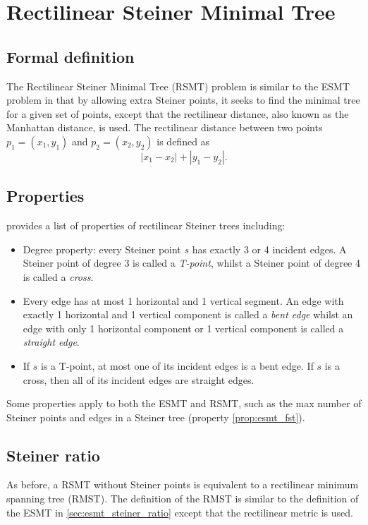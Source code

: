 \documentclass{l4proj}
\begin{document}
\section{Rectilinear Steiner Minimal Tree}
\subsection{Formal definition}
The Rectilinear Steiner Minimal Tree (RSMT) problem is similar to the ESMT problem in that by allowing extra Steiner points, it seeks to find the minimal tree for a given set of points, except that the rectilinear distance, also known as the Manhattan distance, is used. The rectilinear distance between two points $p_1 = (x_1, y_1)$ and $p_2 = (x_2, y_2)$ is defined as
$$|x_1 - x_2| + |y_1 - y_2|.$$
\subsection{Properties}
\cite{Brazil2015} provides a list of properties of rectilinear Steiner trees including:

\begin{itemize}
    \item Degree property: every Steiner point $s$ has exactly 3 or 4 incident edges. A Steiner point of degree 3 is called a \textit{T-point}, whilst a Steiner point of degree 4 is called a \textit{cross}.
    \item Every edge has at most 1 horizontal and 1 vertical segment. An edge with exactly 1 horizontal and 1 vertical component is called a \textit{bent edge} whilst an edge with only 1 horizontal component or 1 vertical component is called a \textit{straight edge}.
    \item If $s$ is a T-point, at most one of its incident edges is a bent edge. If $s$ is a cross, then all of its incident edges are straight edges.
\end{itemize}
\label{sec:rsmt_properties}
Some properties apply to both the ESMT and RSMT, such as the max number of Steiner points and edges in a Steiner tree (property \ref{prop:esmt_fst}).

\subsection{Steiner ratio}
As before, a RSMT without Steiner points is equivalent to a rectilinear minimum spanning tree (RMST). The definition of the RMST is similar to the definition of the ESMT in \ref{sec:esmt_steiner_ratio} except that the rectilinear metric is used.
\end{document}
